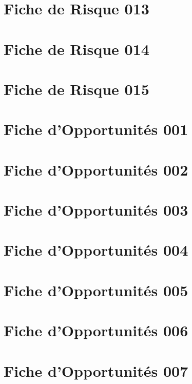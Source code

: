 \documentclass[asi]{picInsa}
\begin{document}
\chapter*{Fiche de Risque 013}

\chapter*{Fiche de Risque 014}

\chapter*{Fiche de Risque 015}



\chapter*{Fiche d'Opportunités 001}

\chapter*{Fiche d'Opportunités 002}

\chapter*{Fiche d'Opportunités 003}

\chapter*{Fiche d'Opportunités 004}

\chapter*{Fiche d'Opportunités 005}

\chapter*{Fiche d'Opportunités 006}

\chapter*{Fiche d'Opportunités 007}

\end{document}
